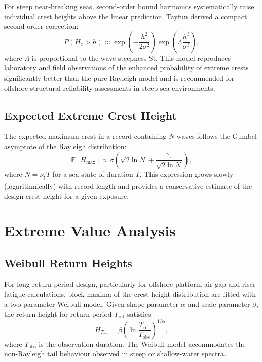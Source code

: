 \documentclass[journal]{IEEEtran}
\begin{document}
    For steep near-breaking seas, second-order bound harmonics systematically
    raise individual crest heights above the linear prediction.
    Tayfun \cite{Tayfun1980} derived a compact second-order correction:
    \begin{equation}
        P(H_c > h) \approx
        \exp\!\left(-\frac{h^2}{2\sigma^2}\right)
        \exp\!\left(\Lambda\frac{h^3}{\sigma^3}\right),
    \end{equation}
    where $\Lambda$ is proportional to the wave steepness $\mathrm{St}$.
    This model reproduces laboratory and field observations of the
    enhanced probability of extreme crests significantly better than the
    pure Rayleigh model and is recommended for offshore structural
    reliability assessments in steep-sea environments.

    \subsection{Expected Extreme Crest Height}

    The expected maximum crest in a record containing $N$ waves follows
    the Gumbel asymptote of the Rayleigh distribution:
    \begin{equation}
        \mathbb{E}[H_\mathrm{max}] \approx
        \sigma\!\left(\sqrt{2\ln N}
        + \frac{\gamma_\mathrm{E}}{\sqrt{2\ln N}}\right),
        \label{eq:maxcrest}
    \end{equation}
    where $N = \nu_\uparrow T$ for a sea state of duration $T$.
    This expression grows slowly (logarithmically) with record length and
    provides a conservative estimate of the design crest height for a
    given exposure.

    \section{Extreme Value Analysis}
    \label{sec:extremes}

    \subsection{Weibull Return Heights}

    For long-return-period design, particularly for offshore platform air
    gap and riser fatigue calculations, block maxima of the crest height
    distribution are fitted with a two-parameter Weibull model.
    Given shape parameter $\alpha$ and scale parameter $\beta$, the
    return height for return period $T_\mathrm{ret}$ satisfies
    \begin{equation}
        H_{T_\mathrm{ret}} = \beta
        \!\left(\ln\frac{T_\mathrm{ret}}{T_\mathrm{obs}}\right)^{1/\alpha},
    \end{equation}
    where $T_\mathrm{obs}$ is the observation duration.
    The Weibull model accommodates the non-Rayleigh tail behaviour
    observed in steep or shallow-water spectra.
\end{document}
